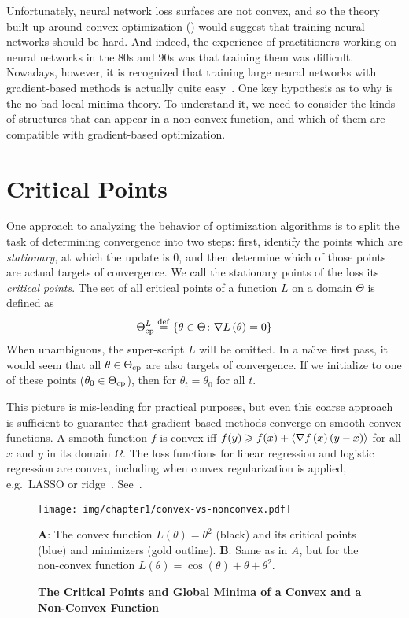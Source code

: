 \documentclass[../../thesis.tex]{subfiles}
\begin{document}
Unfortunately,
neural network loss surfaces are not convex,
and so the theory built up around convex optimization
(\cite{bubeck2015,boyd2004})
would suggest that training neural networks should be hard.
And indeed, the experience of practitioners
working on neural networks in the 80s and 90s
was that training them was difficult.
Nowadays, however,
it is recognized that training large neural networks
with gradient-based methods
is actually quite easy~\cite{sun2019}.
One key hypothesis as to why is the
no-bad-local-minima theory.
To understand it,
we need to consider the kinds of structures
that can appear in a non-convex function,
and which of them are compatible with gradient-based optimization.

\section{Critical Points}

One approach to analyzing the behavior of optimization algorithms
is to split the task of determining convergence
into two steps:
first, identify the points which are \emph{stationary},
at which the update is $0$,
and then determine which of those points are actual targets of convergence.
We call the stationary points of the loss its \emph{critical points}.
The set of all critical points of a function $L$
on a domain $\Theta$ is defined as
\begin{equation}\equationlabel{def-thetacp}
	\Theta^L_{\cp} \defeq \Set{\theta \in \Theta \suchthat \grad{L}{\theta} = 0}
\end{equation}
When unambiguous, the super-script $L$ will be omitted.
In a na{\"\i}ve first pass,
it would seem that all $\theta \in \Theta_{\mathrm{cp}}$
are also targets of convergence.
If we initialize  to one of these points
($\theta_{0} \in \Theta_{\mathrm{cp}}$),
then for $\theta_t = \theta_0$ for all $t$.

This picture is mis-leading for practical purposes,
but even this coarse approach is sufficient to guarantee
that gradient-based methods converge on smooth convex functions.
A smooth function $f$ is convex iff
$f(y) \geqslant f(x) + \langle\nabla f\left(x\right)(y - x)\rangle$
for all $x$ and $y$ in its domain $\Omega$.
The loss functions for linear regression and
logistic regression are convex,
including when convex regularization is applied,
e.g.~LASSO or ridge~\cite{hastie2016}.
See~.

\begin{figure}[ht]
	\begin{center}
		\texttt{[image: img/chapter1/convex-vs-nonconvex.pdf]}
	\end{center}
	\caption{\textbf{The Critical Points and Global Minima
	of a Convex and a Non-Convex Function}}{\textbf{A}:
	The convex function $L(\theta) = \theta^2$ (black)
	and its critical points (blue)
	and minimizers (gold outline).
	\textbf{B}:
	Same as in \emph{A}, but for the non-convex function
	$L(\theta) = \cos(\theta) + \theta +\theta^2$.}
\end{figure}
\end{document}
